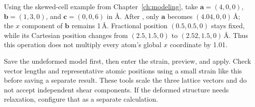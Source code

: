 Using the skewed-cell example from Chapter~\ref{ch:modeling}, take $\mathbf a=(4,0,0)$, $\mathbf b=(1,3,0)$, and $\mathbf c=(0,0,6)$ in \AA. After , only $\mathbf a$ becomes $(4.04,0,0)\,\text{\AA}$; the $x$ component of $\mathbf b$ remains 1\,\AA. Fractional position $(0.5,0.5,0)$ stays fixed, while its Cartesian position changes from $(2.5,1.5,0)$ to $(2.52,1.5,0)\,\text{\AA}$. Thus this operation does not multiply every atom's global $x$ coordinate by 1.01.

Save the undeformed model first, then enter the strain, preview, and apply. Check vector lengths and representative atomic positions using a small strain like this before saving a separate result. These tools scale the three lattice vectors and do not accept independent shear components. If the deformed structure needs relaxation, configure that as a separate calculation.
